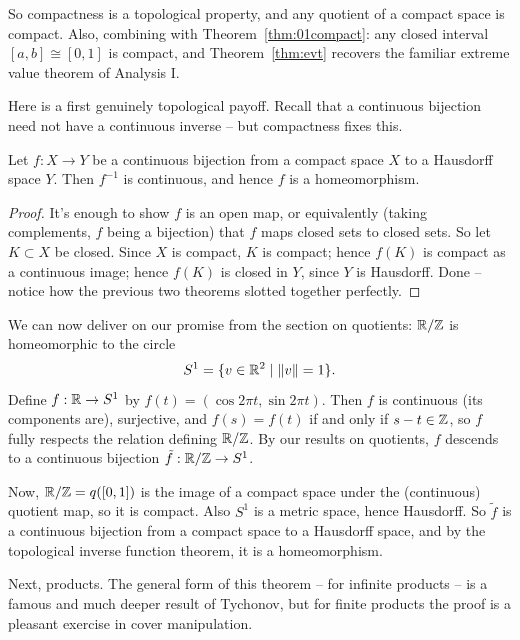 \documentclass[a4paper]{scrartcl}
\begin{document}
So compactness is a topological property, and any quotient of a compact space is compact. Also, combining with Theorem~\ref{thm:01compact}: any closed interval $[a, b] \cong [0, 1]$ is compact, and Theorem~\ref{thm:evt} recovers the familiar extreme value theorem of Analysis I.

Here is a first genuinely topological payoff. Recall that a continuous bijection need not have a continuous inverse -- but compactness fixes this.

\begin{theorem}\label{thm:topift}
    Let $f: X \rightarrow Y$ be a continuous bijection from a compact space $X$ to a Hausdorff space $Y$. Then $f^{-1}$ is continuous, and hence $f$ is a homeomorphism.
\end{theorem}
\begin{proof}
    It's enough to show $f$ is an open map, or equivalently (taking complements, $f$ being a bijection) that $f$ maps closed sets to closed sets. So let $K \subset X$ be closed. Since $X$ is compact, $K$ is compact; hence $f(K)$ is compact as a continuous image; hence $f(K)$ is closed in $Y$, since $Y$ is Hausdorff. Done -- notice how the previous two theorems slotted together perfectly.
\end{proof}

\begin{example}[$\R/\Z \cong S^1$]
    We can now deliver on our promise from the section on quotients: $\mathbb{R}/\mathbb{Z}$ is homeomorphic to the circle
    $$
    S^1 = \{v \in \mathbb{R}^2 \mid \norm{v} = 1\}.
    $$
    Define $f: \mathbb{R} \rightarrow S^1$ by $f(t) = (\cos 2\pi t, \sin 2\pi t)$. Then $f$ is continuous (its components are), surjective, and $f(s) = f(t)$ if and only if $s - t \in \mathbb{Z}$, so $f$ fully respects the relation defining $\mathbb{R}/\mathbb{Z}$. By our results on quotients, $f$ descends to a continuous bijection $\tilde{f}: \mathbb{R}/\mathbb{Z} \rightarrow S^1$.

    Now, $\mathbb{R}/\mathbb{Z} = q([0, 1])$ is the image of a compact space under the (continuous) quotient map, so it is compact. Also $S^1$ is a metric space, hence Hausdorff. So $\tilde{f}$ is a continuous bijection from a compact space to a Hausdorff space, and by the topological inverse function theorem, it is a homeomorphism.
\end{example}

Next, products. The general form of this theorem -- for infinite products -- is a famous and much deeper result of Tychonov, but for finite products the proof is a pleasant exercise in cover manipulation.
\end{document}
